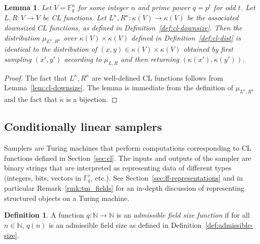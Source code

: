 \documentclass[11pt]{article}
\newtheorem{lemma}[theorem]{Lemma}
\theoremstyle{definition}
\newtheorem{definition}[theorem]{Definition}
\newcommand{\N}{\ensuremath{\mathbb{N}}}
\newcommand{\F}{\ensuremath{\mathbb{F}}}
\newcommand{\downsize}{\kappa}
\begin{document}
\begin{lemma}\label{lem:downsize-cl-dist}
  Let $V = \F_q^n$ for some integer $n$ and prime power $q=p^t$ for odd $t$.
  Let $L,R : V\to V$ be CL functions.
  Let $L^\downsize, R^\downsize : \downsize(V)\to \downsize(V)$ be the
  associated downsized CL functions, as defined in
  Definition~\ref{def:cl-downsize}.
  Then the distribution $\mu_{L^\downsize,R^\downsize}$ over $\downsize(V)\times
  \downsize(V)$ defined in Definition~\ref{def:cl-dist} is identical to the
  distribution of $(x,y) \in \downsize(V)\times \downsize(V)$ obtained by first
  sampling $(x',y')$ according to $\mu_{L,R}$ and then returning
  $(\downsize(x'),\downsize(y'))$.
\end{lemma}

\begin{proof}
  The fact that $L^\downsize, R^\downsize$ are well-defined CL functions follows
  from Lemma~\ref{lem:cl-downsize}.
  The lemma is immediate from the definition of $\mu_{L^\downsize,R^\downsize}$
  and the fact that $\downsize$ is a bijection.
\end{proof}

\subsection{Conditionally linear samplers}
\label{sec:cls}

Samplers are Turing machines that perform computations corresponding to CL
functions defined in Section~\ref{sec:cl}.
The inputs and outputs of the sampler are binary strings that are interpreted as
representing data of different types (integers, bits, vectors in $\F_q^s$,
etc.).
See Section~\ref{sec:ff-representations} and in particular
Remark~\ref{rmk:tm_fields} for an in-depth discussion of representing structured
objects on a Turing machine.

\begin{definition}
	A function $q: \N \to \N$ is an \emph{admissible field size function} if for
  all $n \in \N$, $q(n)$ is an admissible field size as defined in
  Definition~\ref{def:admissible-size}.
\end{definition}
\end{document}
